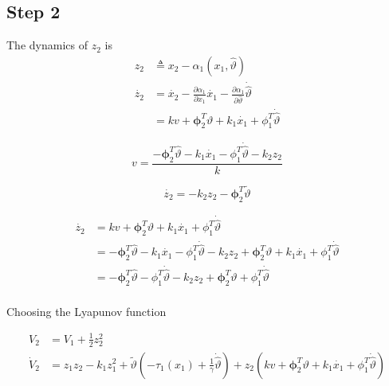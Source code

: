 \documentclass[12pt,a4]{article}
\begin{document}
\subsection{Step 2}
The dynamics of $z_2$ is
\begin{align}
	z_2       & \triangleq x_2 - \alpha_1(x_1,\hat{\vartheta})                                                                                             \\
	\dot{z_2} & = \dot{x_2} - \frac{\partial \alpha_1}{\partial x_1}  \dot{x_1} - \frac{\partial \alpha_1}{\partial \hat{\vartheta}} \dot{\hat{\vartheta}} \\
	          & = k v + \bm{\phi}_2^T \vartheta + k_1 \dot{x_1}+ \phi_1^T \dot{\hat{\vartheta}}
\end{align}

\begin{equation}
	v = \frac{- \bm{\phi}_2^T \hat{\vartheta} - k_1 \dot{x_1} - \phi_1^T\dot{\hat{\vartheta}} - k_2 z_2}{k}
\end{equation}


\begin{equation}
	\dot{z_2} = - k_2 z_2 - \bm{\phi}_2^T \tilde{\vartheta}
\end{equation}



\begin{align}
	\dot{z_2} & = k v + \bm{\phi}_2^T \vartheta + k_1 \dot{x_1}+ \phi_1^T \dot{\hat{\vartheta}}                                                                                        \\
	          & = - \bm{\phi}_2^T \hat{\vartheta} - k_1 \dot{x_1} - \phi_1^T\dot{\hat{\vartheta}} - k_2 z_2 + \bm{\phi}_2^T \vartheta + k_1 \dot{x_1} + \phi_1^T \dot{\hat{\vartheta}} \\
	          & = - \bm{\phi}_2^T \hat{\vartheta}  - \phi_1^T\dot{\hat{\vartheta}} - k_2 z_2 + \bm{\phi}_2^T \vartheta + \phi_1^T \dot{\hat{\vartheta}}                                \\
\end{align}

Choosing the Lyapunov function

\begin{align}
	V_2       & = V_1 + \frac{1}{2} z_2^2                                                                                     \\
	\dot{V}_2 & = z_1 z_2 - k_1 z_1^2 + \tilde{\vartheta} \left( -\tau_1(x_1) + \frac{1}{\gamma}\dot{\hat{\vartheta}} \right)
	+ z_2 \left(  k v + \bm{\phi}_2^T \vartheta + k_1 \dot{x_1}+ \phi_1^T \dot{\hat{\vartheta}} \right)
\end{align}
\end{document}

